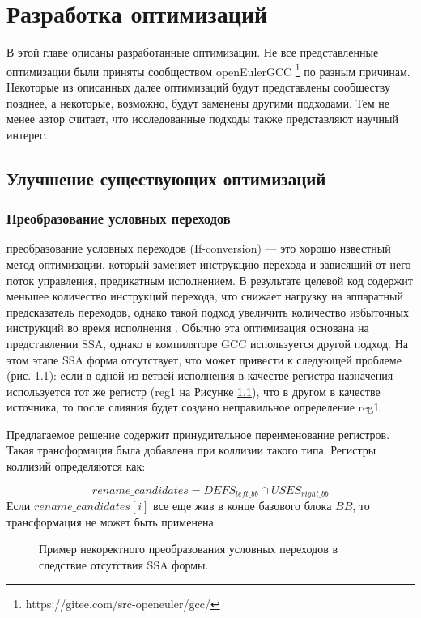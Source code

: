 \chapter{Разработка оптимизаций}\label{ch:ch2}

В этой главе описаны разработанные оптимизации. Не все представленные оптимизации были приняты сообществом openEulerGCC \footnote{https://gitee.com/src-openeuler/gcc/} по разным причинам. Некоторые из описанных далее оптимизаций будут представлены сообществу позднее, а некоторые, возможно, будут заменены другими подходами. Тем не менее автор считает, что исследованные подходы также представляют научный интерес.


\section{Улучшение существующих оптимизаций}\label{sec:ch2/sect1}
\subsection{Преобразование условных переходов} \label{opt:ifconv}
преобразование условных переходов (If-conversion) — это хорошо известный метод оптимизации, который заменяет инструкцию перехода и зависящий от него поток управления, предикатным исполнением. В результате целевой код содержит меньшее количество инструкций перехода, что снижает нагрузку на аппаратный предсказатель переходов, однако такой подход увеличить количество избыточных инструкций во время исполнения \cite{bruel2021if}. Обычно эта оптимизация основана на представлении SSA, однако в компиляторе GCC используется другой подход. На этом этапе SSA форма отсутствует, что может привести к следующей проблеме (рис. \ref{fig:ifcvtsvg1}): если в одной из ветвей исполнения в качестве регистра назначения используется  тот же регистр (reg1 на
Рисунке \ref{fig:ifcvtsvg1}), что в другом в качестве источника, то после слияния будет создано неправильное определение reg1.

Предлагаемое решение содержит принудительное переименование регистров. Такая трансформация была добавлена при коллизии такого типа. Регистры коллизий определяются как:

$$rename\_candidates = DEFS_{left\_bb} \cap USES_{right\_bb} $$
Если $rename\_candidates[i]$ все еще жив в конце базового блока $BB$, то трансформация не может быть применена.


\begin{figure}[htbp]
	\centering

	
	\caption{Пример некоректного преобразования условных переходов в следствие отсутствия SSA формы.}
	\label{fig:ifcvtsvg1}
\end{figure}

